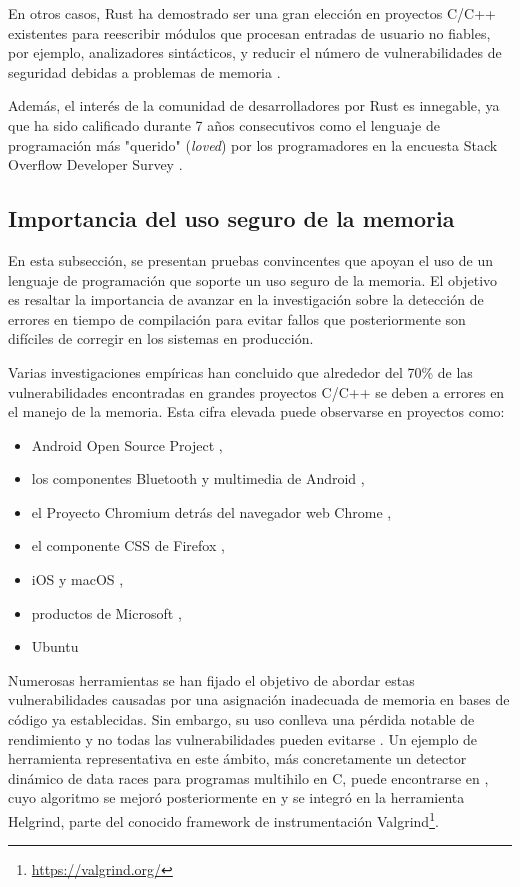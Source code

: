 En otros casos, Rust ha demostrado ser una gran elección en proyectos C/C++ existentes para
reescribir módulos que procesan entradas de usuario no fiables, por ejemplo, analizadores
sintácticos, y reducir el número de vulnerabilidades de seguridad debidas a problemas de
memoria \cite{chifflier2017writing}.

Además, el interés de la comunidad de desarrolladores por Rust es innegable, ya que ha sido
calificado durante 7 años consecutivos como el lenguaje de programación más "querido" (\textit{loved}) por
los programadores en la encuesta Stack Overflow Developer Survey \cite{so-survey2022}.

\subsection{Importancia del uso seguro de la memoria}

En esta subsección, se presentan pruebas convincentes que apoyan el uso de un lenguaje de
programación que soporte un uso seguro de la memoria. El objetivo es resaltar la importancia de avanzar en la
investigación sobre la detección de errores en tiempo de compilación para evitar fallos que
posteriormente son difíciles de corregir en los sistemas en producción.

Varias investigaciones empíricas han concluido que alrededor del 70\% de las vulnerabilidades
encontradas en grandes proyectos C/C++ se deben a errores en el manejo de la memoria. Esta
cifra elevada puede observarse en proyectos como:

\begin{itemize}
      \item Android Open Source Project \cite{memory-bugs-android},
      \item los componentes Bluetooth y multimedia de Android \cite{memory-bugs-android-media-bluetooth},
      \item el Proyecto Chromium detrás del navegador web Chrome \cite{memory-bugs-chrome},
      \item el componente CSS de Firefox \cite{memory-bugs-firefox},
      \item iOS y macOS \cite{memory-bugs-ios-macos},
      \item productos de Microsoft \cite{miller-security-microsoft2019, memory-bugs-microsoft},
      \item Ubuntu \cite{memory-bugs-ubuntu}
\end{itemize}

Numerosas herramientas se han fijado el objetivo de abordar estas vulnerabilidades causadas
por una asignación inadecuada de memoria en bases de código ya establecidas.
Sin embargo, su uso conlleva una pérdida notable de rendimiento y no todas las vulnerabilidades pueden
evitarse \cite{szekeres2013sok}.
Un ejemplo de herramienta representativa en este ámbito, más
concretamente un detector dinámico de data races para programas multihilo en C, puede
encontrarse en \cite{savage1997eraser},
cuyo algoritmo se mejoró posteriormente en \cite{jannesari2009helgrind+}
y se integró en la herramienta Helgrind, parte del conocido framework de instrumentación
Valgrind\footnote{\url{https://valgrind.org/}}.

